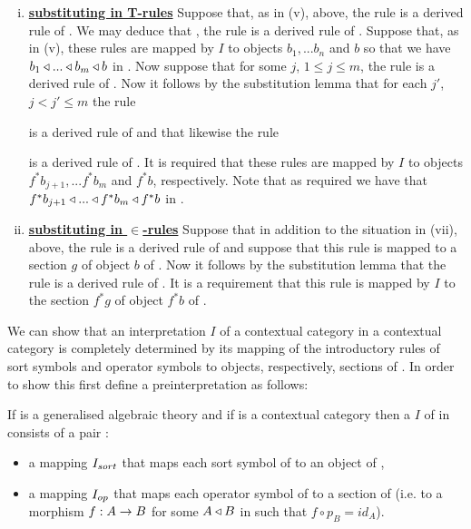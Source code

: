 \begin{definition}
\begin{enumerate}[(i)]
\item \underline{\textbf{substituting in T-rules}} 
Suppose that, as in (v), above, the rule 
 is a derived rule of \gatU.
We may deduce that \foreachj, the rule    is a derived rule of \gatU. 
Suppose that, as in (v), these rules are mapped by $I$ to objects $b_1,...b_n$ and $b$ so that
we have  $b_1 \triangleleft ... \triangleleft b_m \triangleleft b$ in \catc. Now suppose that for some $j$, $1 \leq j \leq m$, the rule
 is a derived rule of \gatU. 
Now it follows by the substitution lemma that for each $j'$, $j < j' \leq m$ the rule

 is a derived rule of \gatUw and that likewise the rule

 is a derived rule of \gatU.
It is required that these rules are mapped by $I$ to objects $f^*b_{j+1},...f^*b_m$ and $f^*b$, respectively.
Note that as required we have that $f^*b_{j+1}\triangleleft ... \triangleleft f^*b_m \triangleleft f^*b$ in \catc.

\item \underline{\textbf{substituting in $\boldsymbol {\in}$-rules}} 
Suppose that in addition to the situation in (vii), above, the rule
is a derived rule of \gatUw and suppose that this rule is mapped to a section $g$ of object $b$ of \catc.
Now it follows by the substitution lemma that the rule
is a derived rule of \gatU.
It is a requirement that this rule is mapped by $I$ to the section $f^*g$ of object $f^*b$ of \catc.
\end{enumerate}
\end{definition}

\note
We can show that an interpretation $I$ of a contextual category \gatUw in a contextual category \catcw is
completely determined by its mapping of the introductory rules of sort symbols and operator symbols to
objects, respectively, sections of \catc. In order to show this first define a preinterpretation as follows:
\begin{definition}
If \gatUw is a generalised algebraic theory  and if \catcw is a contextual category then
a  $I$ of  \gatUw in \catcw consists of a pair :
\begin{itemize}
\item a mapping $I_{sort}$ that maps each sort symbol of \gatUw to  an object of \catc,
\item a mapping $I_{op}$ that maps each operator symbol of \gatUw to a section of \catcw (i.e. to a morphism $f: A \rightarrow B$ for some 
$A \triangleleft B$ in \catcw such that $f \circ p_B=id_A$).
\end{itemize}
\end{definition}

